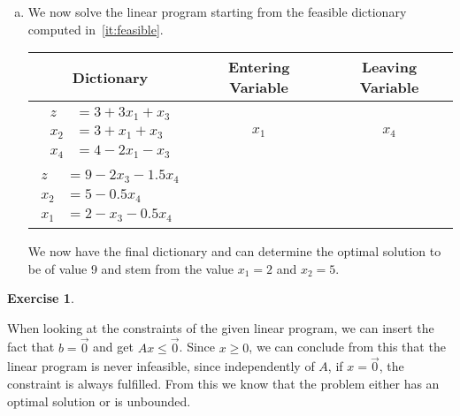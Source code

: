 \documentclass[a4paper,12pt,headsepline]{scrartcl}
\newtheorem{aufgabe}{Exercise}
\begin{document}
\begin{enumerate}[a)]
  \item We now solve the linear program starting from the feasible dictionary computed in~\ref{it:feasible}.
    \begin{center}
      \begin{tabular}{ccc}
        Dictionary & Entering Variable & Leaving Variable \\
        \hline
        \hline
        {$\begin{aligned}
          z &= 3 +3x_1 +x_3 \\
          x_2 &= 3 +x_1 +x_3 \\
          x_4 &= 4 -2x_1 -x_3
        \end{aligned}$} & $x_1$ & $x_4$ \\
        \hline
        {$\begin{aligned}
          z &= 9 -2x_3 -1.5x_4 \\
          x_2 &= 5 -0.5x_4 \\
          x_1 &= 2 -x_3 -0.5x_4
        \end{aligned}$} & 
    \end{tabular}
  \end{center}

  We now have the final dictionary and can determine the optimal solution to be of value 9 and stem from the value $x_1=2$ and $x_2=5$.
\end{enumerate}

\newpage

\begin{aufgabe}
\end{aufgabe}

When looking at the constraints of the given linear program, we can insert the fact that $b=\vec 0$ and get $Ax\le \vec 0$.
Since $x\ge 0$, we can conclude from this that the linear program is never infeasible, since independently of $A$, if $x=\vec 0$, the constraint is always fulfilled.
From this we know that the problem either has an optimal solution or is unbounded.
\end{document}
